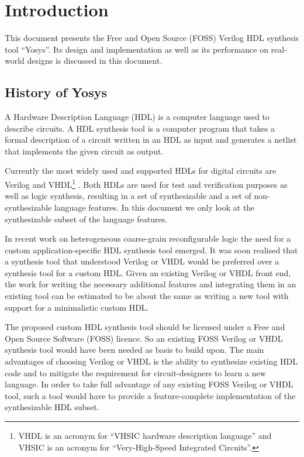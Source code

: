 
\chapter{Introduction}
\label{chapter:intro}

This document presents the Free and Open Source (FOSS) Verilog HDL synthesis tool ``Yosys''.
Its design and implementation as well as its performance on real-world designs
is discussed in this document.

\section{History of Yosys}

A Hardware Description Language (HDL) is a computer language used to describe
circuits. A HDL synthesis tool is a computer program that takes a formal
description of a circuit written in an HDL as input and generates a netlist
that implements the given circuit as output.

Currently the most widely used and supported HDLs for digital circuits are
Verilog \cite{Verilog2005}\cite{VerilogSynth} and
VHDL\footnote{VHDL is an acronym for ``VHSIC hardware description language''
and VHSIC is an acronym for ``Very-High-Speed Integrated
Circuits''.} \cite{VHDL}\cite{VHDLSynth}.
Both HDLs are used for test and verification purposes as well as logic
synthesis, resulting in a set of synthesizable and a set of non-synthesizable
language features. In this document we only look at the synthesizable subset
of the language features.

In recent work on heterogeneous coarse-grain reconfigurable
logic \cite{intersynth} the need for a custom application-specific HDL synthesis
tool emerged. It was soon realised that a synthesis tool that understood Verilog
or VHDL would be preferred over a synthesis tool for a custom HDL. Given an
existing Verilog or VHDL front end, the work for writing the necessary
additional features and integrating them in an existing tool can be estimated to be
about the same as writing a new tool with support for a minimalistic custom HDL.

The proposed custom HDL synthesis tool should be licensed under a Free
and Open Source Software (FOSS) licence. So an existing FOSS Verilog or VHDL
synthesis tool would have been needed as basis to build upon. The main advantages
of choosing Verilog or VHDL is the ability to synthesize existing HDL code and
to mitigate the requirement for circuit-designers to learn a new language. In order to take full advantage of any existing FOSS Verilog or VHDL tool,
such a tool would have to provide a feature-complete implementation of the
synthesizable HDL subset.

